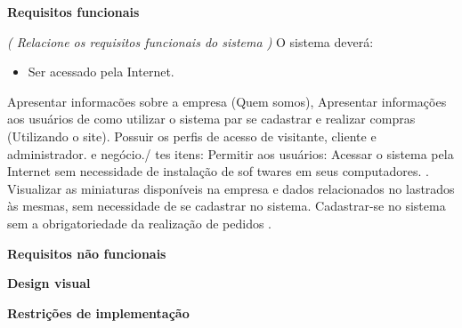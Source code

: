 \vskip 0.4cm
{\fontsize{18pt}{18pt} \selectfont \bf Requisitos funcionais}
\vskip 0.2cm

\textit{ ( Relacione os requisitos funcionais do sistema ) }
O sistema deverá:

\begin{itemize}
    \item Ser acessado pela Internet.

\end{itemize}

Apresentar informacões sobre a empresa (Quem somos),
Apresentar informações aos usuários de como utilizar o sistema par
se cadastrar e realizar compras (Utilizando o site).
Possuir os perfis de acesso de visitante, cliente e administrador.
e
negócio./
tes itens:
Permitir aos usuários:
Acessar o sistema pela Internet sem necessidade de instalação de sof
twares em seus computadores.
. Visualizar as miniaturas disponíveis na empresa e dados relacionados
no
lastrados
às mesmas, sem necessidade de se cadastrar no sistema.
Cadastrar-se no sistema sem a obrigatoriedade da realização de pedidos
.


\vskip 0.4cm
{\fontsize{18pt}{18pt} \selectfont \bf Requisitos não funcionais}
\vskip 0.2cm

\lipsum[1]


\vskip 0.4cm
{\fontsize{18pt}{18pt} \selectfont \bf Design visual}
\vskip 0.2cm

\lipsum[1]


\vskip 0.4cm
{\fontsize{18pt}{18pt} \selectfont \bf Restrições de implementação}
\vskip 0.2cm

\lipsum[1]
